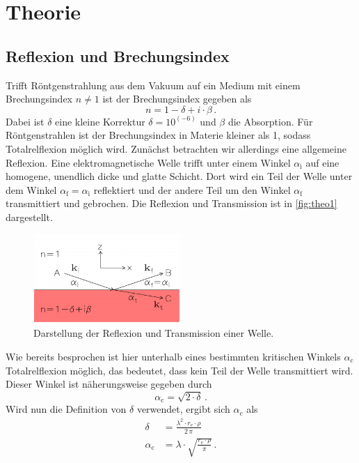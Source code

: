 \section{Theorie}
\label{sec:Theorie}

\subsection{Reflexion und Brechungsindex}
\label{theo1}

Trifft Röntgenstrahlung aus dem Vakuum auf ein Medium mit einem Brechungsindex $n \neq 1$ ist der Brechungsindex gegeben als
\begin{equation}
    n = 1 −  \delta + i \cdot \beta \,.
    \label{eq:index}
\end{equation}
Dabei ist $\delta$ eine kleine Korrektur $\delta = 10^(-6)$ und $\beta$ die Absorption.
Für Röntgenstrahlen ist der Brechungsindex in Materie kleiner als 1, sodass Totalrelflexion möglich wird.
Zunächst betrachten wir allerdings eine allgemeine Reflexion.
Eine elektromagnetische Welle trifft unter einem Winkel $\alpha_\text{i}$ auf eine homogene, unendlich dicke und glatte Schicht.
Dort wird ein Teil der Welle unter dem Winkel $\alpha _\text{f} = \alpha _\text{i}$ reflektiert und der andere Teil um den Winkel $\alpha _\text{f}$ transmittiert und gebrochen.
Die Reflexion und Transmission ist in \autoref{fig:theo1} dargestellt.

\begin{figure}
    \centering
    \includegraphics[width=0.5\textwidth]{images/reflektion.png}
    \caption{Darstellung der Reflexion und Transmission einer Welle. \cite{V44-old}}
    \label{fig:theo1}
\end{figure}

Wie bereits besprochen ist hier unterhalb eines bestimmten kritischen Winkels $\alpha _\text{c}$ Totalrelflexion möglich, das bedeutet, dass kein Teil der Welle transmittiert wird.
Dieser Winkel ist näherungsweise gegeben durch
\begin{equation}
    \alpha _\text{c} = \sqrt{2 \cdot \delta} \,.
    \label{eq:krit}
\end{equation}
Wird nun die Definition von $\delta$ verwendet, ergibt sich $\alpha _c$ als 
\begin{align}
    \delta &= \frac{\lambda ^2 \cdot r_\text{e} \cdot \rho}{2 \, \pi} \\
    \alpha _\text{c} &=  \lambda  \cdot \sqrt{\frac{r_\text{e} \cdot \rho}{\pi}} \,.
\end{align}

